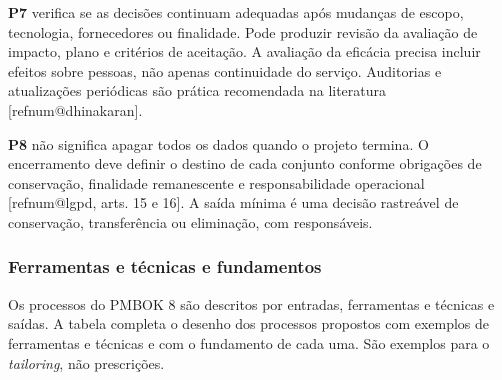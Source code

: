 \documentclass[11pt,a4paper]{article}
\makeatletter
\newcommand{\refnum}[1]{\csname refnum@#1\endcsname}
\makeatother
\begin{document}
\textbf{P7} verifica se as decisões continuam adequadas após mudanças de escopo, tecnologia, fornecedores ou finalidade. Pode produzir revisão da avaliação de impacto, plano e critérios de aceitação. A avaliação da eficácia precisa incluir efeitos sobre pessoas, não apenas continuidade do serviço. Auditorias e atualizações periódicas são prática recomendada na literatura [\refnum{dhinakaran}].

\textbf{P8} não significa apagar todos os dados quando o projeto termina. O encerramento deve definir o destino de cada conjunto conforme obrigações de conservação, finalidade remanescente e responsabilidade operacional [\refnum{lgpd}, arts. 15 e 16]. A saída mínima é uma decisão rastreável de conservação, transferência ou eliminação, com responsáveis.
\subsubsection{Ferramentas e técnicas e fundamentos}

Os processos do PMBOK 8 são descritos por entradas, ferramentas e técnicas e saídas. A tabela completa o desenho dos processos propostos com exemplos de ferramentas e técnicas e com o fundamento de cada uma. São exemplos para o \textit{tailoring}, não prescrições.
\end{document}
